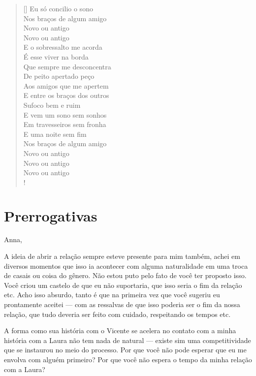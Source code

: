 \begin{verse}[\versewidth]
Eu só concilio o sono\\
Nos braços de algum amigo\\
Novo ou antigo\\
Novo
ou antigo\\
E o sobressalto me acorda\\
É esse viver na borda\\
Que sempre
me desconcentra\\
De peito apertado peço\\
Aos amigos que me apertem\\
E
entre os braços dos outros\\
Sufoco bem e ruim\\
E vem um sono sem
sonhos\\
Em travesseiros sem fronha\\
E uma noite sem fim\\
 Nos braços de algum amigo\\
 Novo ou antigo\\
 Novo ou antigo\\
 Novo ou antigo\\!
\end{verse} 

\chapter{Prerrogativas}




Anna,

\medskip{} 

A ideia de abrir a relação sempre esteve presente para mim também, achei
em diversos momentos que isso ia acontecer com alguma naturalidade em
uma troca de casais ou coisa do gênero. Não estou puto pelo fato de você
ter proposto isso. Você criou um castelo de que eu não suportaria, que
isso seria o fim da relação etc. Acho isso absurdo, tanto é que na
primeira vez que você sugeriu eu prontamente aceitei --- com as
ressalvas de que isso poderia ser o fim da nossa relação, que tudo
deveria ser feito com cuidado, respeitando os tempos etc.

A forma como sua história com o Vicente se acelera
no contato com a minha história com a Laura não tem nada de natural ---
existe sim uma competitividade que se instaurou no meio do processo. Por
que você não pode esperar que eu me envolva com alguém primeiro? Por que
você não espera o tempo da minha relação com a Laura?


